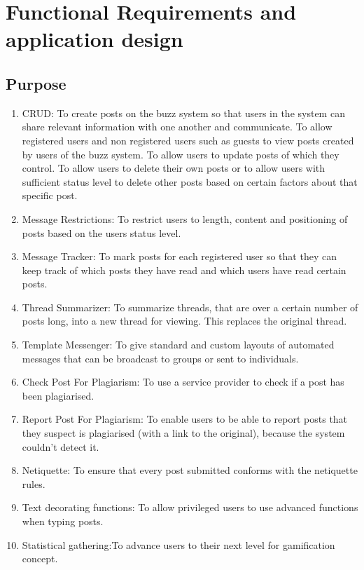 \documentclass[12pt, oneside]{article}
\begin{document}
\section{Functional Requirements and application design}

\subsection{Purpose}
\begin{enumerate}
 \item{CRUD}: To create posts on the buzz system so that users in the system can share relevant information with one another and communicate. To allow registered users and non registered users such as guests to view posts created by users of the buzz system. To allow users to update posts of which they control. To allow users to delete their own posts or to allow users with sufficient status level to delete other posts based on certain factors about that specific post.
 \\
\item{Message Restrictions}: To restrict users to length, content and positioning of posts based on the users status level. 
\\
 \item{Message Tracker}: To mark posts for each registered user so that they can keep track of which posts they have read and which users have read certain posts.
\\
 \item{Thread Summarizer}: To summarize threads, that are over a certain number of posts long, into a new thread for viewing. This replaces the original thread.
\\
 \item{Template Messenger}: To give standard and custom layouts of automated messages that can be broadcast to groups or sent to individuals.
\\
\item{Check Post For Plagiarism}: To use a service provider to check if a post has been plagiarised.
\\
\item{Report Post For Plagiarism}: To enable users to be able to report posts that they suspect is plagiarised (with a link to the original), because the system couldn't detect it.
\\
\item{Netiquette}: To ensure that every post submitted conforms with the netiquette rules.
\\
\item{Text decorating functions}: To allow privileged users to use advanced functions when typing posts.
\\
\item{Statistical gathering}:To advance users to their next level for gamification concept.
\\

 
\end{enumerate}
\end{document}

